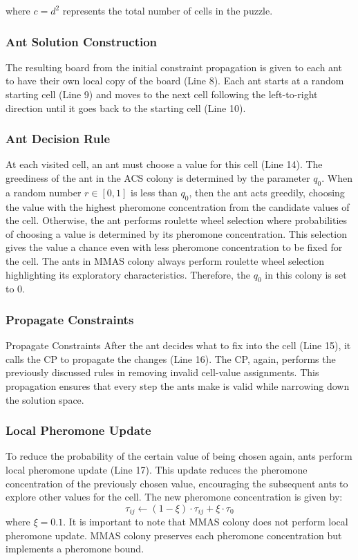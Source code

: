 where $c = d^2$ represents the total number of cells in the puzzle. 

\subsubsection{Ant Solution Construction}
The resulting board from the initial constraint propagation is given to each ant to have their own local copy of the board (Line 8).  Each ant starts at a random starting cell (Line 9) and moves to the next cell following the left-to-right direction until it goes back to the starting cell (Line 10).

\subsubsection{Ant Decision Rule}
At each visited cell, an ant must choose a value for this cell (Line 14). The greediness of the ant in the ACS colony is determined by the parameter $q_{0}$. When a random number $r \in [0, 1]$ is less than $q_{0}$, then the ant acts greedily, choosing the value with the highest pheromone concentration from the candidate values of the cell. Otherwise, the ant performs roulette wheel selection where probabilities of choosing a value is determined by its pheromone concentration. This selection gives the value a chance even with less pheromone concentration to be fixed for the cell. 
The ants in MMAS colony always perform roulette wheel selection highlighting its exploratory characteristics. Therefore, the $q_{0}$ in this colony is set to $0$. 

\subsubsection{Propagate Constraints}
Propagate Constraints
After the ant decides what to fix into the cell (Line 15), it calls the CP to propagate the changes (Line 16). The CP, again, performs the previously discussed rules in removing invalid cell-value assignments. This propagation ensures that every step the ants make is valid while narrowing down the solution space. 

\subsubsection{Local Pheromone Update}
To reduce the probability of the certain value of being chosen again, ants perform local pheromone update (Line 17). This update reduces the pheromone concentration of the previously chosen value, encouraging the subsequent ants to explore other values for the cell. The new pheromone concentration is given by:
\begin{equation}
    \tau_{ij} \leftarrow (1-\xi) \cdot \tau_{ij} + \xi \cdot \tau_0
\label{eqn:localpheromoneupdate}
\end{equation}
where $\xi = 0.1$. 
It is important to note that MMAS colony does not perform local pheromone update. MMAS colony preserves each pheromone concentration but implements a pheromone bound. 

